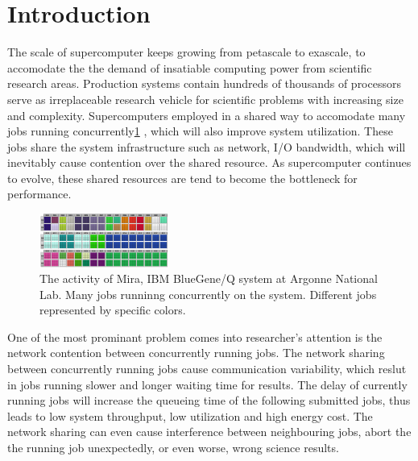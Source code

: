 \documentclass[conference]{IEEEtran}
\begin{document}
\IEEEpeerreviewmaketitle


\section{Introduction} 
\label{sec: intro}

The scale of supercomputer keeps growing from petascale to exascale, to accomodate the the demand of insatiable computing power from scientific research areas. Production systems contain hundreds of thousands of processors serve as irreplaceable research vehicle for scientific problems with increasing size and complexity. Supercomputers employed in a shared way to accomodate many jobs running concurrently\ref{fig: mira activity} , which will also improve system utilization. These jobs share the system infrastructure such as network, I/O bandwidth, which will inevitably cause contention over the shared resource. As supercomputer continues to evolve, these shared resources are tend to become the bottleneck for performance.

\begin{figure}[h!] 
  \centering
  \includegraphics[width=0.38\textwidth]{figs/mira}
   \caption{The activity of Mira, IBM BlueGene/Q system at Argonne National Lab. Many jobs runninng concurrently on the system. Different jobs represented by specific colors. }
   \label{fig: mira activity}
\end{figure}

One of the most prominant problem comes into researcher's attention is the network contention between concurrently running jobs. The network sharing between concurrently running jobs cause communication variability, which reslut in jobs running slower and longer waiting time for results. The delay of currently running jobs will increase the queueing time of the following submitted jobs, thus leads to low system throughput, low utilization and high energy cost. The network sharing can even cause interference between neighbouring jobs, abort the the running job unexpectedly, or even worse, wrong science results. 
\end{document}
